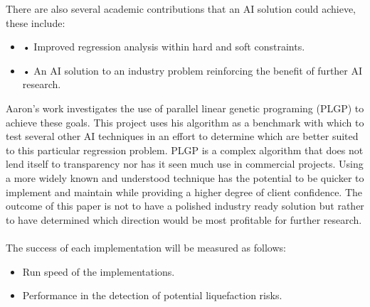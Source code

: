 There are also several academic contributions that an AI solution could achieve, these include:

 \begin{itemize}
 \item • Improved regression analysis within hard and soft constraints.
 \item • An AI solution to an industry problem reinforcing the benefit of further AI research.
 \end{itemize}

Aaron's work investigates the use of parallel linear genetic programing (PLGP) to achieve these goals. This project uses his algorithm as a benchmark with which to test several other AI techniques in an effort to determine which are better suited to this particular regression problem. PLGP is a complex algorithm that does not lend itself to transparency nor has it seen much use in commercial projects. Using a more widely known and understood technique has the potential to be quicker to implement and maintain while providing a higher degree of client confidence. The outcome of this paper is not to have a polished industry ready solution but rather to have determined which direction would be most profitable for further research. 
\\\\
The success of each implementation will be measured as follows:


 \begin{itemize}
 \item Run speed of the implementations.
 \item Performance in the detection of potential liquefaction risks.
 \end{itemize}
 
 
 